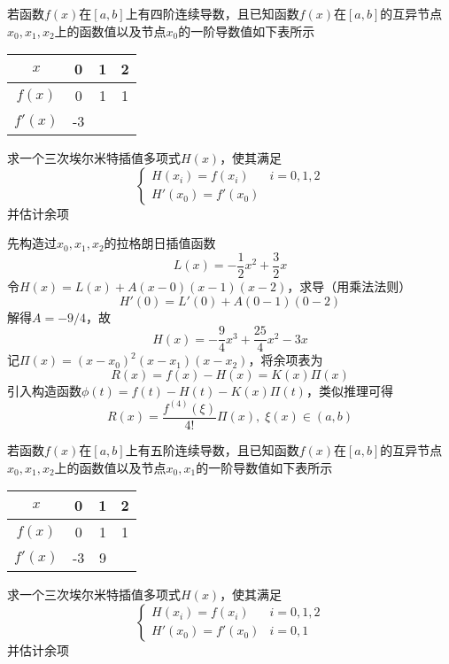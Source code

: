 \begin{example}
    若函数$f(x)$在$[a,b]$上有四阶连续导数，且已知函数$f(x)$在$[a,b]$的互异节点$x_0,x_1,x_2$上的函数值以及节点$x_0$的一阶导数值如下表所示
    \begin{center}
        \begin{tabular}{cccc}\hline
            $x$ & 0 & 1 & 2\\\hline
            $f(x)$ & 0 & 1 & 1\\
            $f'(x)$ & -3\\\hline
        \end{tabular}
    \end{center}
    求一个三次埃尔米特插值多项式$H(x)$，使其满足
    \[\begin{cases}
        H(x_i)=f(x_i) & i=0,1,2\\
        H'(x_0)=f'(x_0)
    \end{cases}\]
    并估计余项
\end{example}
\begin{analysis}
    先构造过$x_0,x_1,x_2$的拉格朗日插值函数
    \[L(x)=-\frac{1}{2}x^2+\frac{3}{2}x\]
    令$H(x)=L(x)+A(x-0)(x-1)(x-2)$，求导（用乘法法则）
    \[H'(0)=L'(0)+A(0-1)(0-2)\]
    解得$A=-9/4$，故
    \[H(x)=-\frac{9}{4}x^3+\frac{25}{4}x^2-3x\]
    记$\Pi(x)=(x-x_0)^2(x-x_1)(x-x_2)$，将余项表为
    \[R(x)=f(x)-H(x)=K(x)\Pi(x)\]
    引入构造函数$\phi(t)=f(t)-H(t)-K(x)\Pi(t)$，类似推理可得
    \[R(x)=\frac{f^{(4)}(\xi)}{4!}\Pi(x),\;\xi(x)\in(a,b)\]
\end{analysis}
\begin{example}
    若函数$f(x)$在$[a,b]$上有五阶连续导数，且已知函数$f(x)$在$[a,b]$的互异节点$x_0,x_1,x_2$上的函数值以及节点$x_0,x_1$的一阶导数值如下表所示
    \begin{center}
        \begin{tabular}{cccc}\hline
            $x$ & 0 & 1 & 2\\\hline
            $f(x)$ & 0 & 1 & 1\\
            $f'(x)$ & -3 & 9\\\hline
        \end{tabular}
    \end{center}
    求一个三次埃尔米特插值多项式$H(x)$，使其满足
    \[\begin{cases}
        H(x_i)=f(x_i) & i=0,1,2\\
        H'(x_0)=f'(x_0) & i=0,1
    \end{cases}\]
    并估计余项
\end{example}
